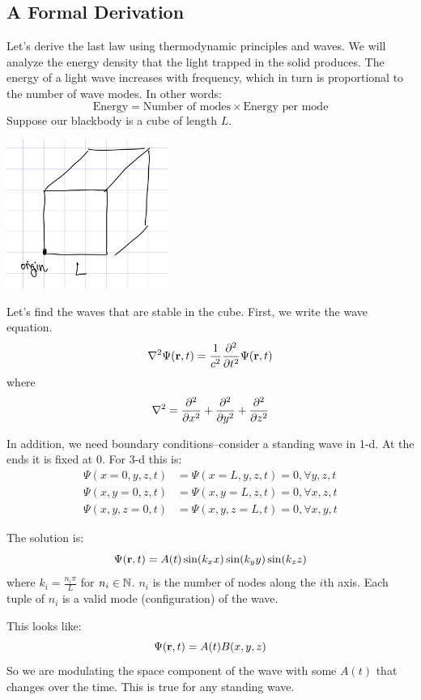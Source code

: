 \subsection{A Formal Derivation}

Let's derive the last law using thermodynamic principles and waves. We will analyze the energy density that the light trapped in the solid
produces. The energy of a light wave increases with frequency, which in turn is proportional to the number of wave modes. In other words:
\[ \text{Energy} = \text{Number of modes} \times \text{Energy per mode} \]
Suppose our blackbody is a cube of length $L$.
\begin{center}
    \includegraphics[width=200px]{../images/L_cube.jpeg}
\end{center}
Let's find the waves that are stable in the cube.
First, we write the wave equation.
\[ \nabla^2 \Psi(\mbf{r}, t) = \frac{1}{c^2} \partialderivative{^2}{t^2} \Psi(\mbf{r}, t) \]
where
\[ \nabla^2 = \partialderivative{^2}{x^2} + \partialderivative{^2}{y^2} + \partialderivative{^2}{z^2} \]

In addition, we need boundary conditions--consider a standing wave in 1-d. At the ends it is fixed at 0. For 3-d this is:
\begin{align*}
    \Psi(x = 0, y, z, t) &= \Psi(x = L, y, z, t) = 0, \forall y, z, t \\ 
    \Psi(x, y = 0, z, t) &= \Psi(x, y = L, z, t) = 0, \forall x, z, t \\
    \Psi(x, y, z = 0, t) &= \Psi(x, y, z = L, t) = 0, \forall x, y, t
\end{align*}

The solution is:
\[ \Psi(\mathbf{r}, t) = A(t) \sin(k_x x) \sin(k_y y) \sin(k_z z) \]
where $k_i = \frac{n_i \pi }{L}$ for $n_i \in \operatorname{\mathbb{N}}$. $n_i$ is the number of nodes along the $i$th axis. Each tuple of $n_i$ is a valid mode (configuration) of the wave.

This looks like:
\[ \Psi(\mathbf{r}, t) = A(t) B(x, y, z) \]
So we are modulating the space component of the wave with some $A(t)$ that changes over the time. This is true for any standing wave.